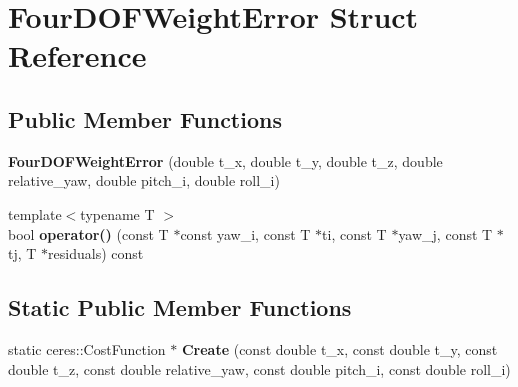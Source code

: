 \hypertarget{structFourDOFWeightError}{}\section{Four\+D\+O\+F\+Weight\+Error Struct Reference}
\label{structFourDOFWeightError}
\subsection*{Public Member Functions}
\begin{DoxyCompactItemize}
\item 
\mbox{\label{structFourDOFWeightError_a382c3009ffec9bb996e005f8739811bf}} 
{\bfseries Four\+D\+O\+F\+Weight\+Error} (double t\+\_\+x, double t\+\_\+y, double t\+\_\+z, double relative\+\_\+yaw, double pitch\+\_\+i, double roll\+\_\+i)
\item 
\mbox{\label{structFourDOFWeightError_a5d12eeb14f585d7a3fd5abc06bfe62fa}} 
{\footnotesize template$<$typename T $>$ }\\bool {\bfseries operator()} (const T $\ast$const yaw\+\_\+i, const T $\ast$ti, const T $\ast$yaw\+\_\+j, const T $\ast$tj, T $\ast$residuals) const
\end{DoxyCompactItemize}
\subsection*{Static Public Member Functions}
\begin{DoxyCompactItemize}
\item 
\mbox{\label{structFourDOFWeightError_a9413ab42c4e85c03da1d6afbee0a3e7d}} 
static ceres\+::\+Cost\+Function $\ast$ {\bfseries Create} (const double t\+\_\+x, const double t\+\_\+y, const double t\+\_\+z, const double relative\+\_\+yaw, const double pitch\+\_\+i, const double roll\+\_\+i)
\end{DoxyCompactItemize}
